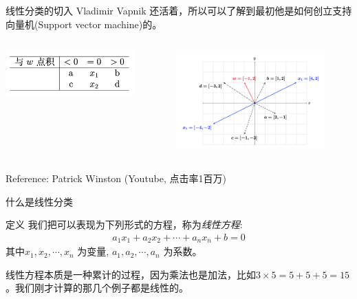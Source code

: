 \documentclass[handout]{ctexbeamer}
\begin{document}
\begin{frame}{线性分类的切入}
Vladimir Vapnik 还活着，所以可以了解到最初他是如何创立支持向量机(Support vector machine)的。
\begin{columns}
\begin{column}{0.3\textwidth}
\centering
\includegraphics[width=\textwidth]{fig/P2dotpTable}
\end{column}
\begin{column}{0.7\textwidth}
	\begin{figure}[H]
	\centering
	\includegraphics[width=\textwidth]{fig/C2C2dotprodt}
\end{figure}	
\end{column}
\end{columns}
Reference: Patrick Winston (Youtube, 点击率1百万)
\end{frame}

\begin{frame}{什么是线性分类}
	\begin{block}{定义}
	我们把可以表现为下列形式的方程，称为\textit{线性方程}:
	\begin{align*}
		a_1 x_1 + a_2 x_2 + \cdots + a_n x_n + b = 0
	\end{align*}
	其中$x_1, x_2, \cdots, x_n$ 为变量, $a_1, a_2, \cdots, a_n$ 为系数。
\end{block}
线性方程本质是一种累计的过程，因为乘法也是加法，比如$3 \times 5 = 5 + 5 + 5 = 15$。我们刚才计算的那几个例子都是线性的。
\end{frame}
\end{document}
